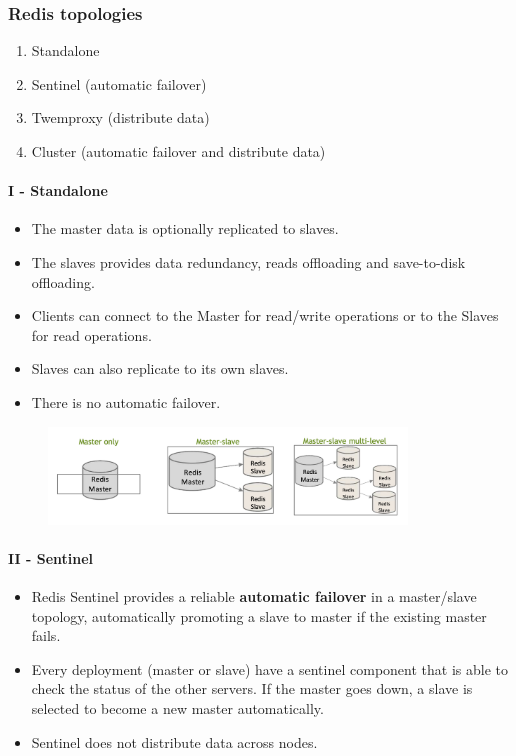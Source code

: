 \documentclass[10pt,a4paper]{article}
\begin{document}
\subsubsection{Redis topologies}

\begin{enumerate}
	\item Standalone
	\item Sentinel (automatic failover)
	\item Twemproxy (distribute data)
	\item Cluster (automatic failover and distribute data)
\end{enumerate}

\paragraph{I - Standalone} 
\begin{itemize}
	\item The master data is optionally replicated to slaves.
	\item The slaves provides data redundancy, reads offloading and save-to-disk offloading.
	\item Clients can connect to the Master for read/write operations or to the Slaves for read operations.
	\item Slaves can also replicate to its own slaves.
	\item There is no automatic failover.
\end{itemize}

\begin{figure}[h!]
 \hfill \includegraphics[width=270pt]{images/redis-standalone.png}\hspace*{\fill}
\end{figure} 

\paragraph{II - Sentinel} 
\begin{itemize}
	\item Redis Sentinel provides a reliable \textbf{automatic failover} in a master/slave topology, automatically promoting a slave to master if the existing master fails.
	\item Every deployment (master or slave) have a sentinel component that is able to check the status of the other servers. If the master goes down, a slave is selected to become a new master automatically.
	\item Sentinel does not distribute data across nodes.
\end{itemize}
\end{document}
